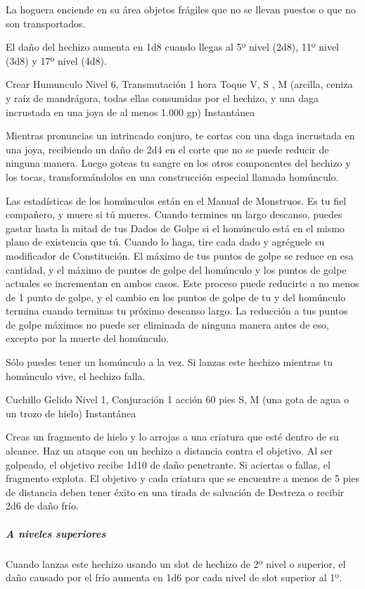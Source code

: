 \documentclass[a4paper,twocolumn,openany,10pt]{dndbook}
\begin{document}
	La hoguera enciende en su área objetos frágiles que no se llevan puestos o que no son transportados.
	
	El daño del hechizo aumenta en 1d8 cuando llegas al 5º nivel (2d8), 11º nivel (3d8) y 17º nivel (4d8). 

\spellheader%
	{Crear Humunculo}
	{Nivel 6, Transmutación}
	{1 hora}
	{Toque}
	{V, S , M (arcilla, ceniza y raíz de mandrágora, todas ellas consumidas por el hechizo, y una daga incrustada en una joya de
	al menos 1.000 gp)}
	{Instantánea}
	
	Mientras pronuncias un intrincado conjuro, te cortas con una daga incrustada en una joya, recibiendo un daño de 2d4 en el
	corte que no se puede reducir de ninguna manera. Luego goteas tu sangre en los otros componentes del hechizo y los tocas,
	transformándolos en una construcción especial llamada homúnculo.
	
	Las estadísticas de los homúnculos están en el Manual de Monstruos. Es tu fiel compañero, y muere si tú mueres. Cuando
	termines un largo descanso, puedes gastar hasta la mitad de tus Dados de Golpe si el homúnculo está en el mismo plano de
	existencia que tú. Cuando lo haga, tire cada dado y agréguele su modificador de Constitución. El máximo de tus puntos de
	golpe se reduce en esa cantidad, y el máximo de puntos de golpe del homúnculo y los puntos de golpe actuales se incrementan
	en ambos casos. Este proceso puede reducirte a no menos de 1 punto de golpe, y el cambio en los puntos de golpe de tu y del
	homúnculo termina cuando terminas tu próximo descanso largo. La reducción a tus puntos de golpe máximos no puede ser
	eliminada de ninguna manera antes de eso, excepto por la muerte del homúnculo.
	
	Sólo puedes tener un homúnculo a la vez. Si lanzas este hechizo mientras tu homúnculo vive, el hechizo falla.

	\spellheader%
	{Cuchillo Gelido}
	{Nivel 1, Conjuración}
	{1 acción}
	{60 pies}
	{S, M (una gota de agua o un trozo de hielo)}
	{Instantánea}
	
	Creas un fragmento de hielo y lo arrojas a una criatura que esté dentro de su alcance. Haz un ataque con un hechizo a
	distancia contra el objetivo. Al ser golpeado, el objetivo recibe 1d10 de daño penetrante. Si aciertas o fallas, el
	fragmento explota. El objetivo y cada criatura que se encuentre a menos de 5 pies de distancia deben tener éxito en una
	tirada de salvación de Destreza o recibir 2d6 de daño frío.
	
	\subparagraph{A niveles superiores} Cuando lanzas este hechizo usando un slot de hechizo de 2º nivel o superior, el daño
	causado por el frío aumenta en 1d6 por cada nivel de slot superior al 1º. 
\end{document}
